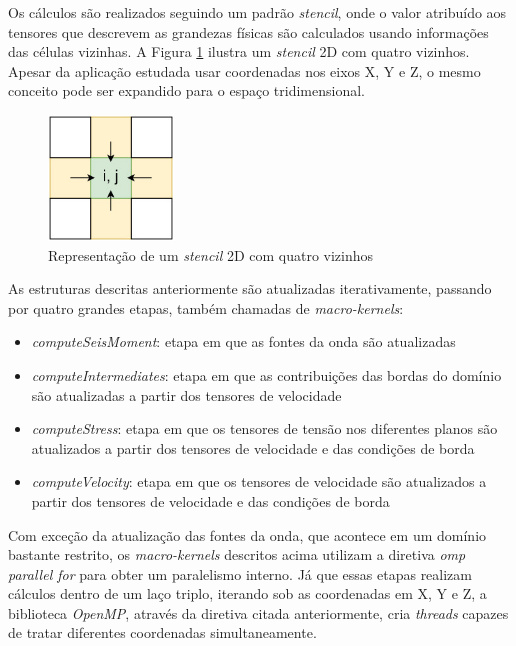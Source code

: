 \documentclass[cic,tc]{iiufrgs}
\begin{document}
Os cálculos são realizados seguindo um padrão \textit{stencil}, onde o valor atribuído aos tensores que descrevem as grandezas físicas são calculados usando informações
das células vizinhas. A Figura \ref{fig:stencil} ilustra um \textit{stencil} 2D com quatro vizinhos. Apesar da aplicação estudada usar coordenadas nos eixos X, Y e Z, o mesmo
conceito pode ser expandido para o espaço tridimensional.

\begin{figure}[!htb]
    \caption{Representação de um \textit{stencil} 2D com quatro vizinhos}
    \begin{center}
      \includegraphics[width=9em]{stencil}
    \end{center}
    \label{fig:stencil}
\end{figure}

As estruturas descritas anteriormente são atualizadas iterativamente, passando por quatro grandes etapas, também chamadas de \textit{macro-kernels}:

\begin{itemize}
\item{\textit{computeSeisMoment}:} etapa em que as fontes da onda são atualizadas
\item{\textit{computeIntermediates}:} etapa em que as contribuições das bordas do domínio são atualizadas a partir dos tensores de velocidade
\item{\textit{computeStress}:} etapa em que os tensores de tensão nos diferentes planos são atualizados a partir dos tensores de velocidade e das condições de borda
\item{\textit{computeVelocity}:} etapa em que os tensores de velocidade são atualizados a partir dos tensores de velocidade e das condições de borda
\end{itemize}

Com exceção da atualização das fontes da onda, que acontece em um domínio bastante restrito, os \textit{macro-kernels} descritos acima utilizam a diretiva \textit{omp parallel for}
para obter um paralelismo interno. Já que essas etapas realizam cálculos dentro de um laço triplo, iterando sob as coordenadas em X, Y e Z, a biblioteca \textit{OpenMP}, através
da diretiva citada anteriormente, cria \textit{threads} capazes de tratar diferentes coordenadas simultaneamente.
\end{document}
